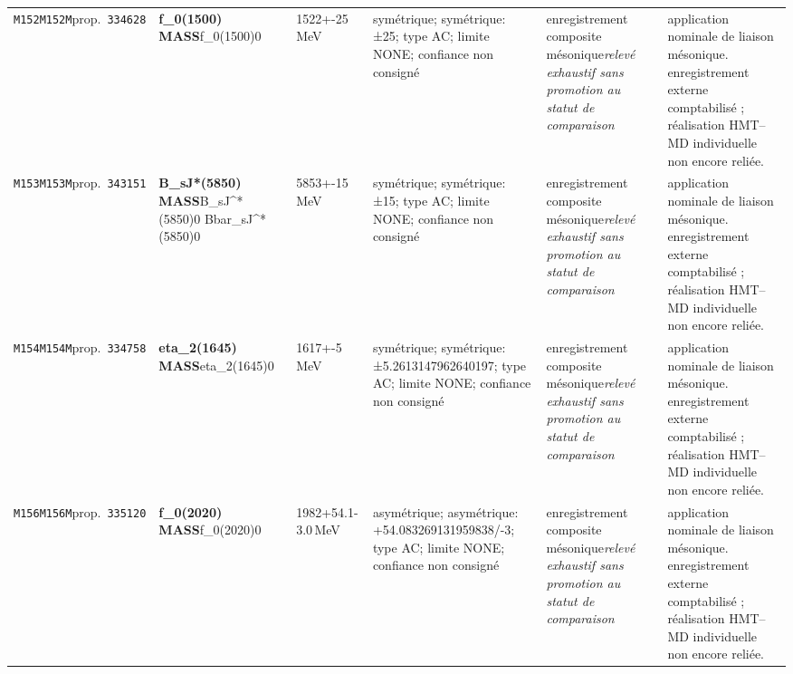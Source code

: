 \begin{landscape}
\begin{longtable}{L{1.85cm}L{4.45cm}L{2.35cm}L{4.05cm}L{3.35cm}L{7.15cm}}
\texttt{M152}\newline \texttt{M152M}\newline prop.\ \texttt{334628} & \textbf{f\_\allowbreak{}0(1500) MASS}\newline f\_\allowbreak{}0(1500)0 & 1522+-25\,MeV & symétrique; symétrique: ±25; type AC; limite NONE; confiance non consigné & enregistrement composite mésonique\newline \emph{relevé exhaustif sans promotion au statut de comparaison} & application nominale de liaison mésonique. enregistrement externe comptabilisé ; réalisation HMT--MD individuelle non encore reliée. \\
\texttt{M153}\newline \texttt{M153M}\newline prop.\ \texttt{343151} & \textbf{B\_\allowbreak{}sJ*(5850) MASS}\newline B\_\allowbreak{}sJ\textasciicircum{}*(5850)0 \textbar{}\allowbreak{} Bbar\_\allowbreak{}sJ\textasciicircum{}*(5850)0 & 5853+-15\,MeV & symétrique; symétrique: ±15; type AC; limite NONE; confiance non consigné & enregistrement composite mésonique\newline \emph{relevé exhaustif sans promotion au statut de comparaison} & application nominale de liaison mésonique. enregistrement externe comptabilisé ; réalisation HMT--MD individuelle non encore reliée. \\
\texttt{M154}\newline \texttt{M154M}\newline prop.\ \texttt{334758} & \textbf{eta\_\allowbreak{}2(1645) MASS}\newline eta\_\allowbreak{}2(1645)0 & 1617+-5\,MeV & symétrique; symétrique: ±5.2613147962640197; type AC; limite NONE; confiance non consigné & enregistrement composite mésonique\newline \emph{relevé exhaustif sans promotion au statut de comparaison} & application nominale de liaison mésonique. enregistrement externe comptabilisé ; réalisation HMT--MD individuelle non encore reliée. \\
\texttt{M156}\newline \texttt{M156M}\newline prop.\ \texttt{335120} & \textbf{f\_\allowbreak{}0(2020) MASS}\newline f\_\allowbreak{}0(2020)0 & 1982+54.1-3.0\,MeV & asymétrique; asymétrique: +54.083269131959838/-3; type AC; limite NONE; confiance non consigné & enregistrement composite mésonique\newline \emph{relevé exhaustif sans promotion au statut de comparaison} & application nominale de liaison mésonique. enregistrement externe comptabilisé ; réalisation HMT--MD individuelle non encore reliée. \\

\end{longtable}
\end{landscape}
